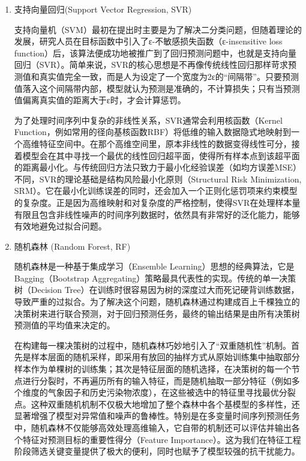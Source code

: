 \begin{enumerate}[label=（\arabic*）, leftmargin=0pt, itemindent=4.5em, labelsep=0.5em, listparindent=2em, parsep=0pt]

    \item 支持向量回归(Support Vector Regression, SVR)
    
    支持向量机（SVM）最初在提出时主要是为了解决二分类问题，但随着理论的发展，研究人员在目标函数中引入了ε-不敏感损失函数（ε-insensitive loss function）后，该算法便成功地被推广到了回归预测问题中，也就是支持向量回归（SVR）。简单来说，SVR的核心思想是不再像传统线性回归那样苛求预测值和真实值完全一致，而是人为设定了一个宽度为2ε的“间隔带”。只要预测值落入这个间隔带内部，模型就认为预测是准确的，不计算损失；只有当预测值偏离真实值的距离大于ε时，才会计算惩罚。

    为了处理时间序列中复杂的非线性关系，SVR通常会利用核函数（Kernel Function，例如常用的径向基核函数RBF）将低维的输入数据隐式地映射到一个高维特征空间中。在那个高维空间里，原本非线性的数据变得线性可分，接着模型会在其中寻找一个最优的线性回归超平面，使得所有样本点到该超平面的距离最小化。与传统回归方法只致力于最小化经验误差（如均方误差MSE）不同，SVR的理论基础是结构风险最小化原则（Structural Risk Minimization, SRM）。它在最小化训练误差的同时，还会加入一个正则化惩罚项来约束模型的复杂度。正是因为高维映射和对复杂度的严格控制，使得SVR在处理样本量有限且包含非线性噪声的时间序列数据时，依然具有非常好的泛化能力，能够有效地避免过拟合问题。

    \item 随机森林 (Random Forest, RF)
    
    随机森林是一种基于集成学习（Ensemble Learning）思想的经典算法，它是 Bagging（Bootstrap Aggregating）策略最具代表性的实现。传统的单一决策树（Decision Tree）在训练时很容易因为树的深度过大而死记硬背训练数据，导致严重的过拟合。为了解决这个问题，随机森林通过构建成百上千棵独立的决策树来进行联合预测，对于回归预测任务，最终的输出结果是由所有决策树预测值的平均值来决定的。

    在构建每一棵决策树的过程中，随机森林巧妙地引入了“双重随机性”机制。首先是样本层面的随机采样，即采用有放回的抽样方式从原始训练集中抽取部分样本作为单棵树的训练集；其次是特征层面的随机选择，在决策树的每一个节点进行分裂时，不再遍历所有的输入特征，而是随机抽取一部分特征（例如多个维度的气象因子和历史污染物浓度），在这些被选中的特征里寻找最优分裂点。这种双重随机机制不仅极大地增加了整个森林中各个基模型的多样性，还显著增强了模型对异常值和噪声的鲁棒性。特别是在多变量时间序列预测任务中，随机森林不仅能够高效处理高维输入，它自带的机制还可以评估并输出各个特征对预测目标的重要性得分（Feature Importance）。这为我们在特征工程阶段筛选关键变量提供了极大的便利，同时也赋予了模型较强的抗干扰能力。


\end{enumerate}

